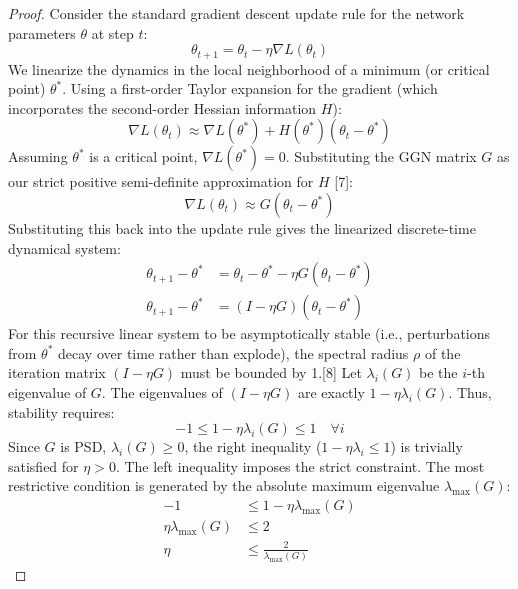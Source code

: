 \documentclass[11pt, a4paper]{article}
\begin{document}
\begin{proof}
Consider the standard gradient descent update rule for the network parameters $\theta$ at step $t$:
\begin{equation}
    \theta_{t+1} = \theta_t - \eta \nabla L(\theta_t)
\end{equation}
We linearize the dynamics in the local neighborhood of a minimum (or critical point) $\theta^*$. Using a first-order Taylor expansion for the gradient (which incorporates the second-order Hessian information $H$):
\begin{equation}
    \nabla L(\theta_t) \approx \nabla L(\theta^*) + H(\theta^*) (\theta_t - \theta^*)
\end{equation}
Assuming $\theta^*$ is a critical point, $\nabla L(\theta^*) = 0$. Substituting the GGN matrix $G$ as our strict positive semi-definite approximation for $H$ [7]:
\begin{equation}
    \nabla L(\theta_t) \approx G (\theta_t - \theta^*)
\end{equation}
Substituting this back into the update rule gives the linearized discrete-time dynamical system:
\begin{align}
    \theta_{t+1} - \theta^* &= \theta_t - \theta^* - \eta G (\theta_t - \theta^*) \\
    \theta_{t+1} - \theta^* &= (I - \eta G) (\theta_t - \theta^*) \label{eq:dynamics}
\end{align}
For this recursive linear system to be asymptotically stable (i.e., perturbations from $\theta^*$ decay over time rather than explode), the spectral radius $\rho$ of the iteration matrix $(I - \eta G)$ must be bounded by 1.[8] Let $\lambda_i(G)$ be the $i$-th eigenvalue of $G$. The eigenvalues of $(I - \eta G)$ are exactly $1 - \eta \lambda_i(G)$. Thus, stability requires:
\begin{equation}
    -1 \le 1 - \eta \lambda_i(G) \le 1 \quad \forall i
\end{equation}
Since $G$ is PSD, $\lambda_i(G) \ge 0$, the right inequality ($1 - \eta \lambda_i \le 1$) is trivially satisfied for $\eta > 0$. The left inequality imposes the strict constraint. The most restrictive condition is generated by the absolute maximum eigenvalue $\lambda_{\max}(G)$:
\begin{align}
    -1 &\le 1 - \eta \lambda_{\max}(G) \\
    \eta \lambda_{\max}(G) &\le 2 \\
    \eta &\le \frac{2}{\lambda_{\max}(G)} \label{eq:eos_base}
\end{align}

\end{proof}
\end{document}
